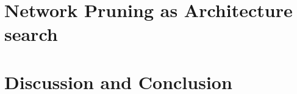 \documentclass{article} %
\begin{document}


\section{Network Pruning as Architecture search}
\label{sec:arch}




\section{Discussion and Conclusion}





\clearpage
\begin{appendices}
 

\end{appendices}
\end{document}
